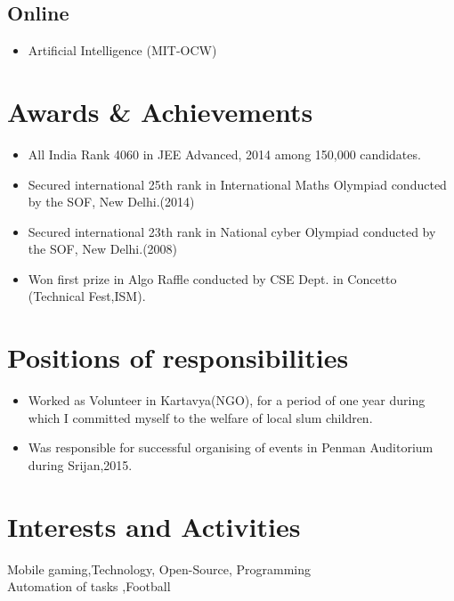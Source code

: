 \documentclass[a4paper,10pt]{article}
\begin{document}
\subsection*{Online}
\begin{itemize}
    \item Artificial Intelligence (MIT-OCW)
\end{itemize}

\section{Awards \& Achievements}
\begin{itemize}
    \item All India Rank 4060 in JEE Advanced, 2014 among 150,000 candidates.
    \item Secured international 25th rank in International Maths Olympiad conducted by the SOF, New Delhi.(2014)
    \item Secured international 23th rank in National cyber Olympiad conducted by the SOF, New Delhi.(2008)
    \item Won first prize in Algo Raffle conducted by CSE Dept. in Concetto (Technical Fest,ISM).
\end{itemize}

\section{Positions of responsibilities}
\begin{itemize}
    \item Worked as Volunteer in Kartavya(NGO), for a period of one year during which I committed myself to the welfare of local slum children.
    \item Was responsible for successful organising of events in Penman Auditorium during Srijan,2015.
\end{itemize}

\section{Interests and Activities}
Mobile gaming,Technology, Open-Source, Programming\\
Automation of tasks ,Football\\
\end{document}
